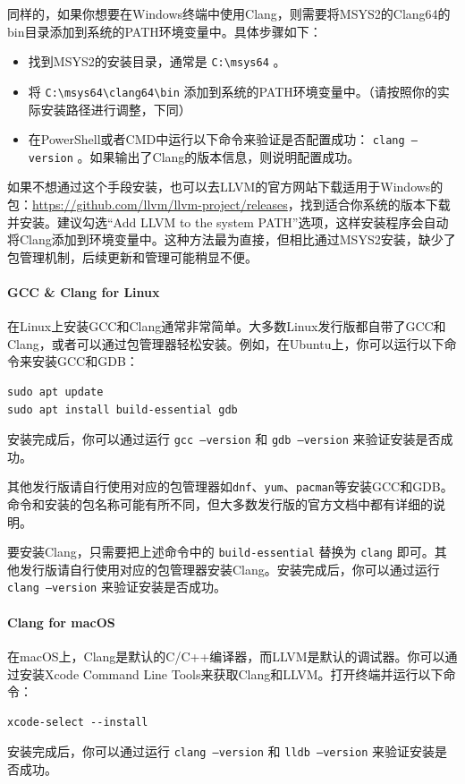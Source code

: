 同样的，如果你想要在Windows终端中使用Clang，则需要将MSYS2的Clang64的bin目录添加到系统的PATH环境变量中。具体步骤如下：
\begin{itemize}
  \item 找到MSYS2的安装目录，通常是 \verb|C:\msys64| 。
  \item 将 \verb|C:\msys64\clang64\bin| 添加到系统的PATH环境变量中。（请按照你的实际安装路径进行调整，下同）
  \item 在PowerShell或者CMD中运行以下命令来验证是否配置成功： \texttt{clang --version} 。如果输出了Clang的版本信息，则说明配置成功。
\end{itemize}

如果不想通过这个手段安装，也可以去LLVM的官方网站下载适用于Windows的包：\url{https://github.com/llvm/llvm-project/releases}，找到适合你系统的版本下载并安装。建议勾选“Add LLVM to the system PATH”选项，这样安装程序会自动将Clang添加到环境变量中。这种方法最为直接，但相比通过MSYS2安装，缺少了包管理机制，后续更新和管理可能稍显不便。

\paragraph{GCC \& Clang for Linux} 在Linux上安装GCC和Clang通常非常简单。大多数Linux发行版都自带了GCC和Clang，或者可以通过包管理器轻松安装。例如，在Ubuntu上，你可以运行以下命令来安装GCC和GDB：
\begin{verbatim}
sudo apt update
sudo apt install build-essential gdb
\end{verbatim}
安装完成后，你可以通过运行 \texttt{gcc --version} 和 \texttt{gdb --version} 来验证安装是否成功。

其他发行版请自行使用对应的包管理器如\texttt{dnf}、\texttt{yum}、\texttt{pacman}等安装GCC和GDB。命令和安装的包名称可能有所不同，但大多数发行版的官方文档中都有详细的说明。

要安装Clang，只需要把上述命令中的 \verb|build-essential| 替换为 \verb|clang| 即可。其他发行版请自行使用对应的包管理器安装Clang。安装完成后，你可以通过运行 \texttt{clang --version} 来验证安装是否成功。

\paragraph{Clang for macOS} 在macOS上，Clang是默认的C/C++编译器，而LLVM是默认的调试器。你可以通过安装Xcode Command Line Tools来获取Clang和LLVM。打开终端并运行以下命令：
\begin{verbatim}
xcode-select --install
\end{verbatim}
安装完成后，你可以通过运行 \texttt{clang --version} 和 \texttt{lldb --version} 来验证安装是否成功。

